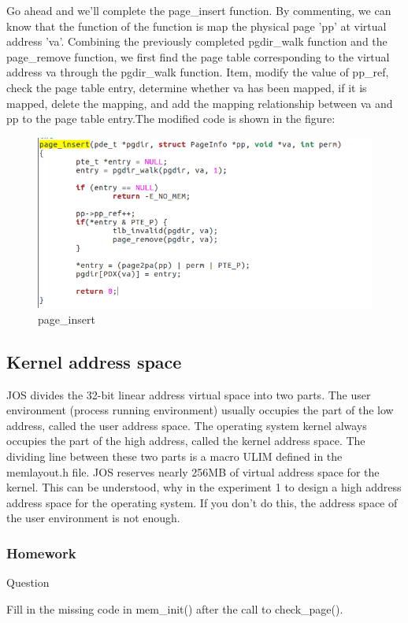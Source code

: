 Go ahead and we'll complete the page\_insert function. By commenting, we can know that the function of the function is map the physical page 'pp' at virtual address 'va'. Combining the previously completed pgdir\_walk function and the page\_remove function, we first find the page table corresponding to the virtual address va through the pgdir\_walk function. Item, modify the value of pp\_ref, check the page table entry, determine whether va has been mapped, if it is mapped, delete the mapping, and add the mapping relationship between va and pp to the page table entry.The modified code is shown in the figure:
\begin{figure}[H]
\centering
\includegraphics[width=0.8\linewidth]{figure/page_insert_changed}
\caption{page\_insert}
\end{figure}

\subsection{Kernel address space}

JOS divides the 32-bit linear address virtual space into two parts. The user environment (process running environment) usually occupies the part of the low address, called the user address space. The operating system kernel always occupies the part of the high address, called the kernel address space. The dividing line between these two parts is a macro ULIM defined in the memlayout.h file. JOS reserves nearly 256MB of virtual address space for the kernel. This can be understood, why in the experiment 1 to design a high address address space for the operating system. If you don't do this, the address space of the user environment is not enough.

\subsubsection{Homework }
\begin{flushleft}
{\Large Question}
\end{flushleft}
Fill in the missing code in mem\_init() after the call to check\_page().

